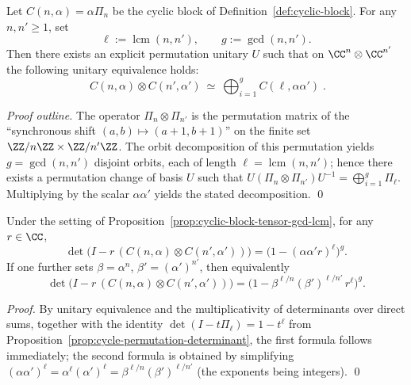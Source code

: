 \begin{proposition}\label{prop:cyclic-block-tensor-gcd-lcm}
Let \(C(n,\alpha)=\alpha\Pi_n\) be the cyclic block of Definition~\ref{def:cyclic-block}.
For any \(n,n'\ge 1\), set
\[
\ell:=\operatorname{lcm}(n,n'),\qquad g:=\gcd(n,n').
\]
Then there exists an explicit permutation unitary \(U\) such that on \(\CC^{n}\otimes\CC^{n'}\) the following unitary equivalence holds:
\[
\boxed{\;
C(n,\alpha)\otimes C(n',\alpha')\ \simeq\
\bigoplus_{i=1}^{g} C(\ell,\alpha\alpha')\; }.
\]
\end{proposition}

\begin{proof}[Proof outline]
The operator \(\Pi_n\otimes\Pi_{n'}\) is the permutation matrix of the ``synchronous shift \((a,b)\mapsto(a+1,b+1)\)'' on the finite set \(\ZZ/n\ZZ\times\ZZ/n'\ZZ\).
The orbit decomposition of this permutation yields \(g=\gcd(n,n')\) disjoint orbits, each of length \(\ell=\operatorname{lcm}(n,n')\);
hence there exists a permutation change of basis \(U\) such that
\(
U(\Pi_n\otimes\Pi_{n'})U^{-1}=\bigoplus_{i=1}^{g}\Pi_{\ell}
\).
Multiplying by the scalar \(\alpha\alpha'\) yields the stated decomposition. \qed
\end{proof}

\begin{corollary}\label{cor:cyclic-block-tensor-determinant}
Under the setting of Proposition~\ref{prop:cyclic-block-tensor-gcd-lcm}, for any \(r\in\CC\),
\[
\det\!\bigl(I-r\,(C(n,\alpha)\otimes C(n',\alpha'))\bigr)
=\bigl(1-(\alpha\alpha' r)^{\ell}\bigr)^{g}.
\]
If one further sets \(\beta=\alpha^n\), \(\beta'=(\alpha')^{n'}\), then equivalently
\[
\det\!\bigl(I-r\,(C(n,\alpha)\otimes C(n',\alpha'))\bigr)
=\bigl(1-\beta^{\ell/n}(\beta')^{\ell/n'}\,r^{\ell}\bigr)^{g}.
\]
\end{corollary}

\begin{proof}
By unitary equivalence and the multiplicativity of determinants over direct sums, together with the identity
\(
\det(I-t\Pi_{\ell})=1-t^{\ell}
\)
from Proposition~\ref{prop:cycle-permutation-determinant}, the first formula follows immediately; the second formula is obtained by simplifying \((\alpha\alpha')^{\ell}=\alpha^{\ell}(\alpha')^{\ell}=\beta^{\ell/n}(\beta')^{\ell/n'}\) (the exponents being integers). \qed
\end{proof}

